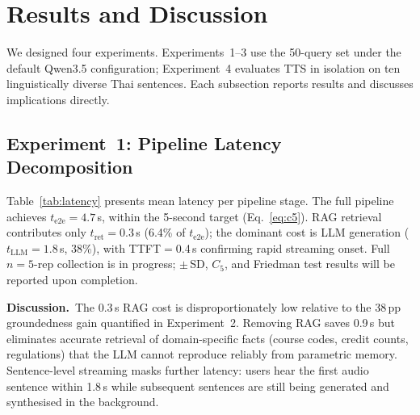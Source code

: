 \documentclass[10pt, a4paper, twocolumn]{article}
\begin{document}
\section{Results and Discussion}
\label{sec:results}

We designed four experiments.
Experiments~1--3 use the 50-query set under the default Qwen3.5
configuration; Experiment~4 evaluates TTS in isolation on ten
linguistically diverse Thai sentences.
Each subsection reports results and discusses implications directly.

\subsection{Experiment~1: Pipeline Latency Decomposition}

Table~\ref{tab:latency} presents mean latency per pipeline stage.
The full pipeline achieves $t_\text{e2e}{=}4.7$\,s, within the
5-second target (Eq.~\ref{eq:c5}).
RAG retrieval contributes only $t_\text{ret}{=}0.3$\,s (6.4\% of
$t_\text{e2e}$); the dominant cost is LLM generation
($t_\text{LLM}{=}1.8$\,s, 38\%), with TTFT${=}$0.4\,s confirming
rapid streaming onset.
Full $n{=}5$-rep collection is in progress; $\pm$\,SD, $C_5$, and
Friedman test results will be reported upon completion.

\begin{table}[t]
  \centering
  \caption{Mean pipeline latency (s) across 50 queries.
           $t_\text{TTS}$: time to first sentence playback.
           $\pm$SD and $C_5$ pending $n{=}5$-rep collection.}
  \label{tab:latency}
  \small
\end{table}

\noindent\textbf{Discussion.}\
The 0.3\,s RAG cost is disproportionately low relative to the 38\,pp
groundedness gain quantified in Experiment~2.
Removing RAG saves 0.9\,s but eliminates accurate retrieval of
domain-specific facts (course codes, credit counts, regulations) that
the LLM cannot reproduce reliably from parametric memory.
Sentence-level streaming masks further latency: users hear the first
audio sentence within 1.8\,s while subsequent sentences are still being
generated and synthesised in the background.
\end{document}
